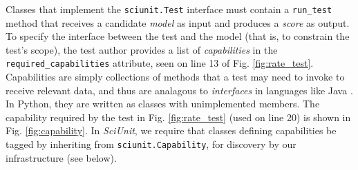 \documentclass[11pt,letterpaper]{article}
\let\verbx\lstinline
\begin{document}
Classes that implement the \verbx{sciunit.Test} interface must contain a \verbx{run_test} method that receives a candidate \emph{model} as input and produces a \textit{score} as output. To specify the interface between the test and the model (that is, to constrain the test's scope), the test author provides a list of \emph{capabilities} in the \verbx{required_capabilities} attribute, seen on line 13 of Fig. \ref{fig:rate_test}. Capabilities are simply collections of methods that a test may need to invoke to receive relevant data, and thus are analagous to \emph{interfaces} in languages like Java \cite{java-interfaces}. In Python, they are written as classes with unimplemented members. The capability required by the test in Fig. \ref{fig:rate_test} (used on line 20) is shown in Fig. \ref{fig:capability}. In \textit{SciUnit}, we require that classes defining capabilities be tagged by inheriting from \verbx{sciunit.Capability}, for discovery by our infrastructure (see below). 
\end{document}
